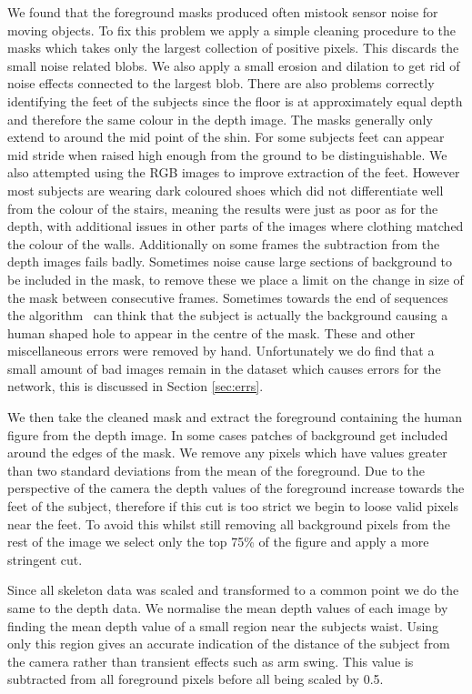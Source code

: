 \documentclass[11pt]{article} %
\begin{document}
We found that the foreground masks produced often mistook sensor noise for moving objects. To fix this problem we apply a simple cleaning procedure to the masks which takes only the largest collection of positive pixels. This discards the small noise related blobs. We also apply a small erosion and dilation to get rid of noise effects connected to the largest blob. There are also problems correctly identifying the feet of the subjects since the floor is at approximately equal depth and therefore the same colour in the depth image. The masks generally only extend to around the mid point of the shin. For some subjects feet can appear mid stride when raised high enough from the ground to be distinguishable. We also attempted using the RGB images to improve extraction of the feet. However most subjects are wearing dark coloured shoes which did not differentiate well from the colour of the stairs, meaning the results were just as poor as for the depth, with additional issues in other parts of the images where clothing matched the colour of the walls. Additionally on some frames the subtraction from the depth images fails badly. Sometimes noise cause large sections of background to be included in the mask, to remove these we place a limit on the change in size of the mask between consecutive frames. Sometimes towards the end of sequences the algorithm~\cite{Zivkovic2004} can think that the subject is actually the background causing a human shaped hole to appear in the centre of the mask. These and other miscellaneous errors were removed by hand. Unfortunately we do find that a small amount of bad images remain in the dataset which causes errors for the network, this is discussed in Section \ref{sec:errs}.

We then take the cleaned mask and extract the foreground containing the human figure from the depth image. In some cases patches of background get included around the edges of the mask. We remove any pixels which have values greater than two standard deviations from the mean of the foreground. Due to the perspective of the camera the depth values of the foreground increase towards the feet of the subject, therefore if this cut is too strict we begin to loose valid pixels near the feet. To avoid this whilst still removing all background pixels from the rest of the image we select only the top 75\% of the figure and apply a more stringent cut. 

Since all skeleton data was scaled and transformed to a common point we do the same to the depth data. We normalise the mean depth values of each image by finding the mean depth value of a small region near the subjects waist. Using only this region gives an accurate indication of the distance of the subject from the camera rather than transient effects such as arm swing. This value is subtracted from all foreground pixels before all being scaled by 0.5. 
\end{document}
